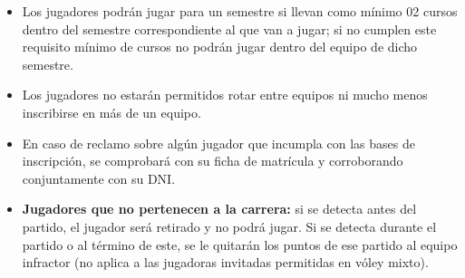 \documentclass[11pt,a4paper]{article}
\begin{document}
\begin{itemize}
	\item Los jugadores podrán jugar para un semestre si llevan como mínimo 02 cursos dentro del semestre correspondiente al que van a jugar; si no cumplen este requisito mínimo de cursos no podrán jugar dentro del equipo de dicho semestre.
	\item Los jugadores no estarán permitidos rotar entre equipos ni mucho menos inscribirse en más de un equipo.
	\item En caso de reclamo sobre algún jugador que incumpla con las bases de inscripción, se comprobará con su ficha de matrícula y corroborando conjuntamente con su DNI.
	\item \textbf{Jugadores que no pertenecen a la carrera:} si se detecta antes del partido, el jugador será retirado y no podrá jugar. Si se detecta durante el partido o al término de este, se le quitarán los puntos de ese partido al equipo infractor (no aplica a las jugadoras invitadas permitidas en vóley mixto).
\end{itemize}
\end{document}
